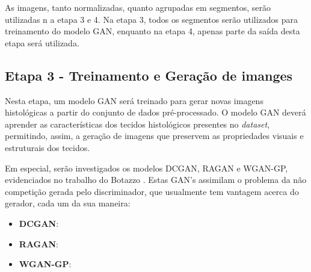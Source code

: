  As imagens, tanto normalizadas, quanto agrupadas em segmentos, serão utilizadas n a etapa 3 e 4. Na etapa 3, todos os segmentos serão utilizados para treinamento do modelo GAN, enquanto na etapa 4, apenas parte da saída desta etapa será utilizada.  

\subsection{Etapa 3 - Treinamento e Geração de imanges}

Nesta etapa, um modelo GAN será treinado para gerar novas imagens histológicas a partir do conjunto de dados pré-processado. O modelo GAN deverá aprender as características dos tecidos histológicos presentes no \textit{dataset}, permitindo, assim, a geração de imagens que preservem as propriedades visuais e estruturais dos tecidos.

Em especial, serão investigados os modelos DCGAN, RAGAN e WGAN-GP, evidenciados no trabalho do Botazzo \cite{rozendo2024histdataaug}. Estas GAN's assimilam o problema da não competição gerada pelo discriminador, que usualmente tem vantagem acerca do gerador, cada um da sua maneira:
\begin{itemize}
  \item \textbf{DCGAN}: 
  \item \textbf{RAGAN}:
  \item \textbf{WGAN-GP}:
\end{itemize}

